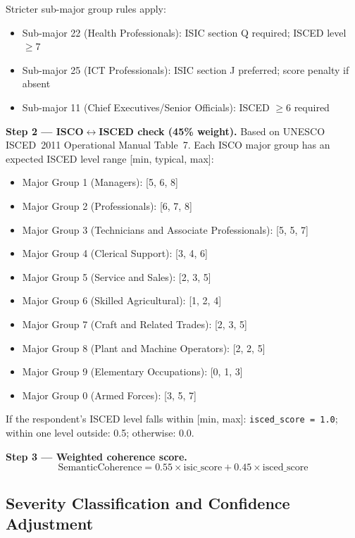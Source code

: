 Stricter sub-major group rules apply:
\begin{itemize}
  \item Sub-major 22 (Health Professionals): ISIC section Q required; ISCED
  level $\geq 7$
  \item Sub-major 25 (ICT Professionals): ISIC section J preferred;
  score penalty if absent
  \item Sub-major 11 (Chief Executives/Senior Officials): ISCED $\geq 6$
  required
\end{itemize}

\textbf{Step 2 --- ISCO$\leftrightarrow$ISCED check (45\% weight).}
Based on UNESCO ISCED~2011 Operational Manual Table~7.
Each ISCO major group has an expected ISCED level range [min, typical, max]:
\begin{itemize}
  \item Major Group 1 (Managers): [5, 6, 8]
  \item Major Group 2 (Professionals): [6, 7, 8]
  \item Major Group 3 (Technicians and Associate Professionals): [5, 5, 7]
  \item Major Group 4 (Clerical Support): [3, 4, 6]
  \item Major Group 5 (Service and Sales): [2, 3, 5]
  \item Major Group 6 (Skilled Agricultural): [1, 2, 4]
  \item Major Group 7 (Craft and Related Trades): [2, 3, 5]
  \item Major Group 8 (Plant and Machine Operators): [2, 2, 5]
  \item Major Group 9 (Elementary Occupations): [0, 1, 3]
  \item Major Group 0 (Armed Forces): [3, 5, 7]
\end{itemize}

If the respondent's ISCED level falls within [min, max]:
\texttt{isced\_score = 1.0}; within one level outside: 0.5; otherwise: 0.0.

\textbf{Step 3 --- Weighted coherence score.}
\begin{equation}
  \text{SemanticCoherence} = 0.55 \times \text{isic\_score}
                           + 0.45 \times \text{isced\_score}
  \label{eq:coherence}
\end{equation}

\subsection{Severity Classification and Confidence Adjustment}

